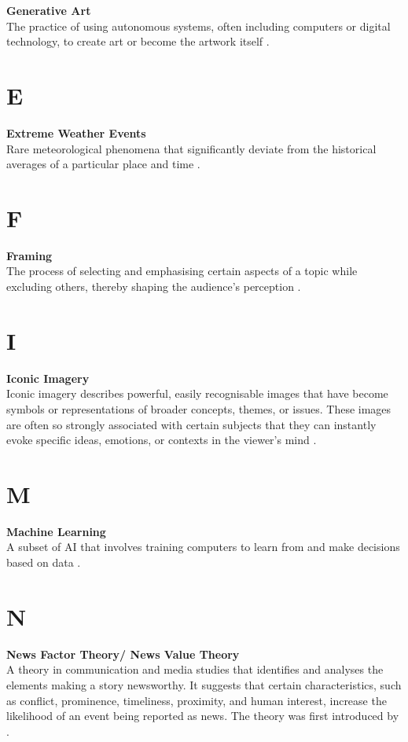 \noindent \textbf{Generative Art}\\
\noindent The practice of using autonomous systems, often including computers or digital technology, to create art or become the artwork itself \parencite{Galanter2019}.

\section*{E}
\noindent \textbf{Extreme Weather Events}\\
\noindent Rare meteorological phenomena that significantly deviate from the historical averages of a particular place and time \parencite{ipcc_2023_technical}.

\section*{F}
\noindent \textbf{Framing}\\
\noindent The process of selecting and emphasising certain aspects of a topic while excluding others, thereby shaping the audience's perception \parencite{Sikorski2020}.

\section*{I}
\noindent \textbf{Iconic Imagery}\\
\noindent Iconic imagery describes powerful, easily recognisable images that have become symbols or representations of broader concepts, themes, or issues. These images are often so strongly associated with certain subjects that they can instantly evoke specific ideas, emotions, or contexts in the viewer's mind \parencite{ONeill2019}.


\section*{M}
\noindent \textbf{Machine Learning}\\
\noindent A subset of AI that involves training computers to learn from and make decisions based on data \parencite{Broussard2019}.

\section*{N}
\noindent \textbf{News Factor Theory/ News Value Theory}\\
\noindent A theory in communication and media studies that identifies and analyses the elements making a story newsworthy. It suggests that certain characteristics, such as conflict, prominence, timeliness, proximity, and human interest, increase the likelihood of an event being reported as news. The theory was first introduced by \textcite{Galtung1965}.

